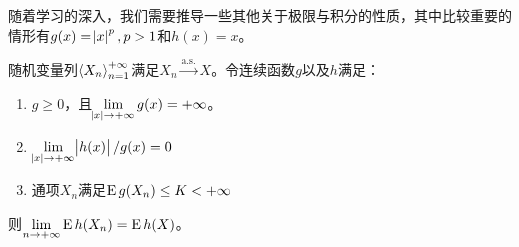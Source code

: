 \documentclass[../main.tex]{subfiles}
\begin{document}
随着学习的深入，我们需要推导一些其他关于极限与积分的性质，其中比较重要的情形有\(g(x)=\envert{x}^p,p>1\)和\(h(x)=x\)。
\begin{theorem}\label{thm:1.6.8}
	随机变量列\(\left<X_n\right>^{+\infty}_{n=1}\)满足\(X_n\xrightarrow{\text{a.s.}}X\)。令连续函数\(g\)以及\(h\)满足：

	\begin{enumerate}
		\item \(g\geq0\)，且\(\lim\limits_{\envert{x}\rightarrow+\infty}g(x)=+\infty\)。
		\item \(\lim\limits_{\envert{x}\rightarrow+\infty}\envert{h(x)}/g(x)=0\)
		\item \label{thm:1.6.8.3} 通项\(X_n\)满足\(\operatorname{E} g(X_n)\leq K<+\infty\)
	\end{enumerate}
	则\(\lim\limits_{n\rightarrow+\infty}\operatorname{E} h(X_n)=\operatorname{E} h(X)\)。
\end{theorem}
\end{document}
